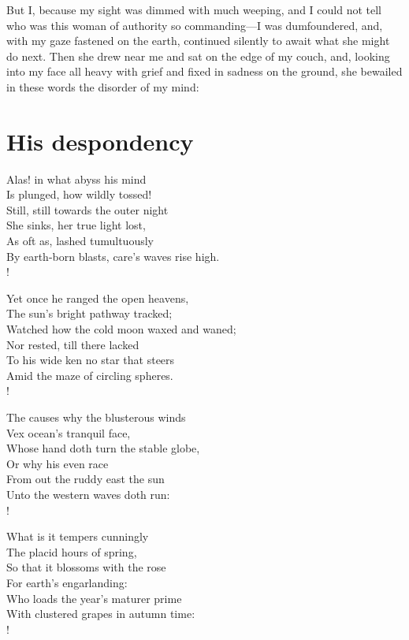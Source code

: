 \documentclass[12pt]{book}
\newenvironment{vpoem}[1]%
  {\def\poemvsindentlines{#1}\begin{poem}\small}%
  {\end{poem}\def\poemvsindentlines{\relax}}
\begin{document}
But I, because my sight was dimmed with much weeping, and I could not
tell who was this woman of authority so commanding---I was dumfoundered,
and, with my gaze fastened on the earth, continued silently to await
what she might do next. Then she drew near me and sat on the edge of my
couch, and, looking into my face all heavy with grief and fixed in
sadness on the ground, she bewailed in these words the disorder of my
mind:



\section{His despondency}

\begin{vpoem}{24}
    Alas! in what abyss his mind \\
      Is plunged, how wildly tossed! \\
    Still, still towards the outer night \\
      She sinks, her true light lost, \\
    As oft as, lashed tumultuously \\
    By earth-born blasts, care's waves rise high. \\!

    Yet once he ranged the open heavens, \\
      The sun's bright pathway tracked; \\
    Watched how the cold moon waxed and waned; \\
      Nor rested, till there lacked \\
    To his wide ken no star that steers \\
    Amid the maze of circling spheres. \\!

    The causes why the blusterous winds \\
      Vex ocean's tranquil face, \\
    Whose hand doth turn the stable globe, \\
      Or why his even race \\
    From out the ruddy east the sun \\
    Unto the western waves doth run: \\!

    What is it tempers cunningly \\
      The placid hours of spring, \\
    So that it blossoms with the rose \\
      For earth's engarlanding: \\
    Who loads the year's maturer prime \\
    With clustered grapes in autumn time: \\!


\end{vpoem}
\end{document}
